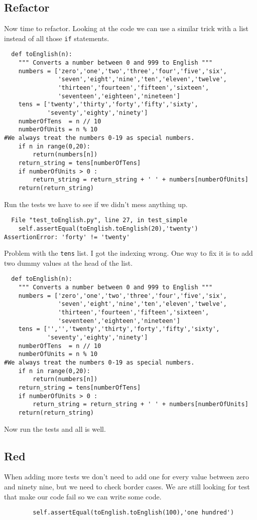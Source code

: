 \documentclass{paper}
\begin{document}
\subsection{Refactor}
Now time to refactor. Looking at the code we can use a similar trick
with a list instead of all those {\tt if} statements.
\begin{lstlisting}
  def toEnglish(n):
    """ Converts a number between 0 and 999 to English """
    numbers = ['zero','one','two','three','four','five','six',
               'seven','eight','nine','ten','eleven','twelve',
               'thirteen','fourteen','fifteen','sixteen',
               'seventeen','eighteen','nineteen']
    tens = ['twenty','thirty','forty','fifty','sixty',
            'seventy','eighty','ninety']
    numberOfTens  = n // 10
    numberOfUnits = n % 10
#We always treat the numbers 0-19 as special numbers.
    if n in range(0,20):
        return(numbers[n])
    return_string = tens[numberOfTens]
    if numberOfUnits > 0 :
        return_string = return_string + ' ' + numbers[numberOfUnits]
    return(return_string)
\end{lstlisting}
Run the tests we have to see if we didn't mess anything up.
\begin{verbatim}
  File "test_toEnglish.py", line 27, in test_simple
    self.assertEqual(toEnglish.toEnglish(20),'twenty')
AssertionError: 'forty' != 'twenty'
\end{verbatim}
Problem with the {\tt tens} list. I got the indexing wrong. One way to
fix it is to add two dummy values at the head of the list.
\begin{lstlisting}
  def toEnglish(n):
    """ Converts a number between 0 and 999 to English """
    numbers = ['zero','one','two','three','four','five','six',
               'seven','eight','nine','ten','eleven','twelve',
               'thirteen','fourteen','fifteen','sixteen',
               'seventeen','eighteen','nineteen']
    tens = ['','','twenty','thirty','forty','fifty','sixty',
            'seventy','eighty','ninety']
    numberOfTens  = n // 10
    numberOfUnits = n % 10
#We always treat the numbers 0-19 as special numbers.
    if n in range(0,20):
        return(numbers[n])
    return_string = tens[numberOfTens]
    if numberOfUnits > 0 :
        return_string = return_string + ' ' + numbers[numberOfUnits]
    return(return_string)
\end{lstlisting}
Now run the tests and all is well.
\subsection{Red}
When adding more tests we don't need to add one for every value between
zero and ninety nine, but we need to check border cases. We are still
looking for test that make our code fail so we can write some code.
\begin{lstlisting}
        self.assertEqual(toEnglish.toEnglish(100),'one hundred')
\end{lstlisting}
\end{document}
